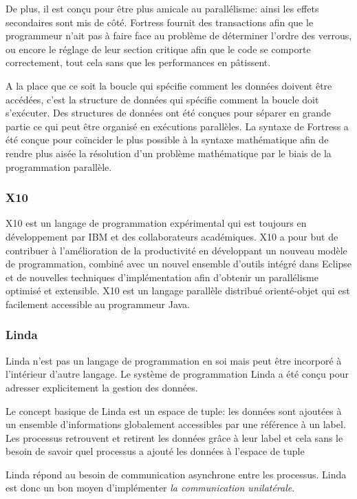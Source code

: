 		De plus, il est conçu pour être plus amicale au parallélisme: ainsi les effets secondaires sont mis de côté. Fortress fournit des transactions afin que le programmeur n'ait pas à faire face au problème de déterminer l'ordre des verrous, ou encore le réglage de leur section critique afin que le code se comporte correctement, tout cela sans que les performances en pâtissent.
		
		A la place que ce soit la boucle qui spécifie comment les données doivent être accédées, c'est la structure de données qui spécifie comment la boucle doit s'exécuter. Des structures de données ont été conçues pour séparer en grande partie ce qui peut être organisé en exécutions parallèles. La syntaxe de Fortress a été conçue pour coïncider le plus possible à la syntaxe mathématique afin de rendre plus aisée la résolution d'un problème mathématique par le biais de la programmation parallèle.
 
		\subsubsection{X10} 
		X10 est un langage de programmation expérimental qui est toujours en développement par IBM et des collaborateurs académiques. X10 a pour but de contribuer à l'amélioration de la productivité en développant un nouveau modèle de programmation, combiné avec un nouvel ensemble d'outils intégré dans Eclipse et de nouvelles techniques d'implémentation afin d'obtenir un parallélisme optimisé et extensible. X10 est un langage parallèle distribué orienté-objet qui est facilement accessible au programmeur Java.
	
		\subsubsection{Linda}
		Linda n'est pas un langage de programmation en soi mais peut être incorporé à l'intérieur d'autre langage. Le système de programmation Linda a été conçu pour adresser explicitement la gestion des données.
		
		Le concept basique de Linda est un espace de tuple: les données sont ajoutées à un ensemble d'informations globalement accessibles par une référence à un label. Les processus retrouvent et retirent les données grâce à leur label et cela sans le besoin de savoir quel processus a ajouté les données à l'espace de tuple
		
		 Linda répond au besoin de communication asynchrone entre les processus. Linda est donc un bon moyen d'implémenter \textit{la communication unilatérale}.
	
